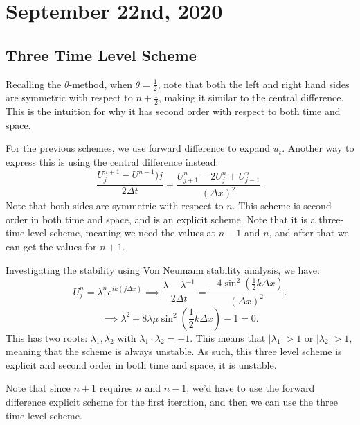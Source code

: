 \documentclass[../main/main.tex]{subfiles}
\begin{document}
\section{September 22nd, 2020}
\subsection{Three Time Level Scheme}
Recalling the $\theta$-method, when $\theta = \frac{1}{2}$, note that both the left and right hand sides are symmetric with respect to $n+\frac{1}{2} $, making it similar to the central difference. This is the intuition for why it has second order with respect to both time and space. 

For the previous schemes, we use forward difference to expand $u_t$. Another way to express this is using the central difference instead:
\[
    \frac{U^{n+1}_j-U^{n-1})j}{2\Delta t} = \frac{U^n_{j+1}-2U^n_j + U^n_{j-1}}{(\Delta x)^2}
.\] Note that both sides are symmetric with respect to $n$. This scheme is second order in both time and space, and is an explicit scheme. Note that it is a three-time level scheme, meaning we need the values at $n-1$ and  $n$, and after that we can get  the values for $n+1$.

Investigating the stability using Von Neumann stability analysis, we have: \[
U^n_j = \lambda^n e^{ik(j\Delta x)} \implies \frac{\lambda-\lambda^{-1}}{2\Delta t} = \frac{-4\sin^2(\frac{1}{2}k\Delta x)}{(\Delta x)^2}
.\] \[
\implies \lambda^2 + 8 \lambda \mu \sin^2(\frac{1}{2}k\Delta x)-1 = 0
.\] This has two roots: $\lambda_1, \lambda_2$ with $\lambda_1\cdot \lambda_2 = -1$. This means that $|\lambda_1|>1$ or $|\lambda_2|>1$, meaning that the scheme is always unstable. As such, this three level scheme is explicit and second order in both time and space, it is unstable.

\begin{remark}
    Note that since $n+1$ requires  $n$ and  $n-1$, we'd have to use the forward difference explicit scheme for the first iteration, and then we can use the three time level scheme. 
\end{remark}
\end{document}
